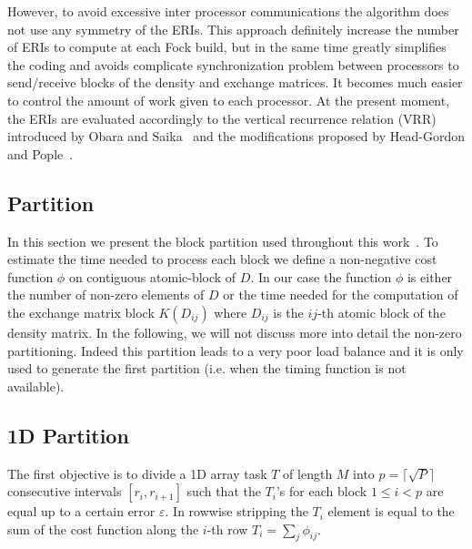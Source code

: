 \documentclass[prl,twocolumn,showpacs,twocolumngrid,superbib]{revtex4}
\begin{document}
 However, to avoid excessive inter processor communications the algorithm 
 does not use any symmetry of the ERIs. This approach
 definitely increase the number of ERIs to compute at each Fock build,
 but in the same time greatly simplifies the coding and avoids complicate
 synchronization problem between processors to send/receive blocks of the 
 density and exchange matrices. It becomes much 
 easier to control the amount of work given to each processor.
 At the present moment, the ERIs are evaluated accordingly to
 the vertical recurrence relation (VRR) introduced by Obara 
 and Saika~\cite{SObara86} and the modifications proposed by Head-Gordon
 and Pople~\cite{MGordon88}.


\subsection{Partition}
 In this section we present the block partition used
 throughout this work~\cite{APinar97,LRomero95}. 
 To estimate the time needed to process each block we define
 a non-negative cost function $\phi$ on contiguous atomic-block of
 $D$. In our case the function $\phi$ is either the number of 
 non-zero elements of $D$ or the time needed for the computation
 of the exchange matrix block $K(D_{ij})$ where $D_{ij}$ is the
 $ij$-th atomic block of the density matrix. In the following, 
 we will not discuss more into detail the non-zero partitioning.
 Indeed this partition leads to a very poor load balance and it is
 only used to generate the first partition (i.e. when 
 the timing function is not available). 

\subsection{1D Partition}
 The first objective is to divide a 1D array task $T$ of length $M$
 into $p=\lceil\sqrt{P}\rceil$ consecutive intervals $[r_i,r_{i+1}]$ such
 that the $T_i$'s for
 each block $1 \le i < p$ are equal up to a certain error
 $\varepsilon$. In rowwise stripping the $T_i$ element is equal
 to the sum of the cost function along the $i$-th row 
 $T_i=\sum_j\phi_{ij}$. 
\end{document}
